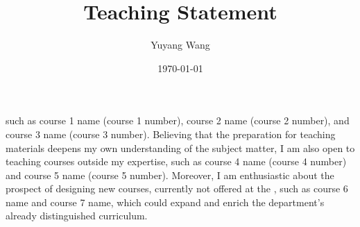 



\title{Teaching Statement}

\def\courseOneName{course 1 name}
\def\courseOneNumber{course 1 number}
\def\courseTwoName{course 2 name}
\def\courseTwoNumber{course 2 number}
\def\courseThreeName{course 3 name}
\def\courseThreeNumber{course 3 number}
\def\courseFourName{course 4 name}
\def\courseFourNumber{course 4 number}
\def\courseFiveName{course 5 name}
\def\courseFiveNumber{course 5 number}
\def\courseSixName{course 6 name}
\def\courseSixNumber{course 6 number}
\def\courseSevenName{course 7 name}
\def\courseSevenNumber{course 7 number}

\def\rsCustom{%
such as \courseOneName{} (\courseOneNumber{}), \courseTwoName{} (\courseTwoNumber{}), and \courseThreeName{} (\courseThreeNumber{}). Believing that the preparation for teaching materials deepens my own understanding of the subject matter, I am also open to teaching courses outside my expertise, such as \courseFourName{} (\courseFourNumber{}) and \courseFiveName{} (\courseFiveNumber{}). Moreover, I am enthusiastic about the prospect of designing new courses, currently not offered at the \appSchool{}, such as \courseSixName{} and \courseSevenName{}, which could expand and enrich the department's already distinguished curriculum.
}

\author{Yuyang Wang}
\date{\today}
\makeatletter
\fancyfoot[L]{\scshape \MakeLowercase{\@author}}
\fancyfoot[R]{{\scshape \MakeLowercase{\@title}}\quad{\LARGE\sfrac{\thepage}{\pageref*{LastPage}}}}
\makeatother



\maketitle%
\thispagestyle{fancy}


\rsCustom{}


\footnotesize


